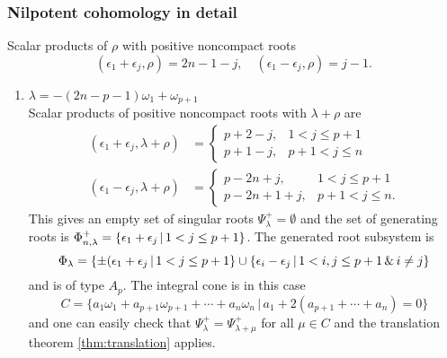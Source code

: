 \subsubsection{Nilpotent cohomology in detail}

Scalar products of $\rho$ with positive noncompact roots
\begin{equation}\label{eq:Dn_rho_scalar_posroots}
 (\epsilon_1 + \epsilon_j, \rho) = 2n-1-j, \quad (\epsilon_1 - \epsilon_j, \rho) = j -1.
\end{equation}


\begin{enumerate}
 \item $ \lambda =  -(2n-p-1)\omega_1+\omega_{p+1}$\\
   Scalar products of positive noncompact roots with $\lambda+\rho$ are
  \begin{align*}
    (\epsilon_1 + \epsilon_j, \lambda+\rho) & = \begin{cases}
                                                 p+2-j, & 1<j\leq p+1 \\
                                                 p+1-j, & p+1<j\leq n
                                                \end{cases}\\
    (\epsilon_1 - \epsilon_j, \lambda+\rho) & = \begin{cases}
                                                 p-2n+j, & 1<j\leq p+1 \\
                                                 p-2n+1+j, & p+1<j\leq n.
                                                \end{cases}
  \end{align*}
  This gives an empty set of singular roots $\Psi^+_\lambda = \emptyset$ and the set of generating roots is $\Phi^+_{n,\lambda} = \{\epsilon_1 + \epsilon_j \,|\, 1<j\leq p+1 \}$. The generated root subsystem is
  \[
   \Phi_\lambda = \{ \pm(\epsilon_1 + \epsilon_j \,|\, 1<j\leq p+1 \} \cup \{ \epsilon_i - \epsilon_j \,|\, 1 < i,j \leq p+1 \,\&\, i\neq j \}
  \]
  and is of type $A_p$. The integral cone is in this case
  \[
    C = \{ a_1\omega_1 + a_{p+1}\omega_{p+1} + \cdots + a_n \omega_n \,|\, a_1 + 2( a_{p+1} + \cdots + a_n) = 0 \}
  \]
  and one can easily check that $\Psi^+_\lambda = \Psi^+_{\lambda+\mu}$ for all $\mu \in C$ and the translation theorem \ref{thm:translation} applies.
  

\end{enumerate}

